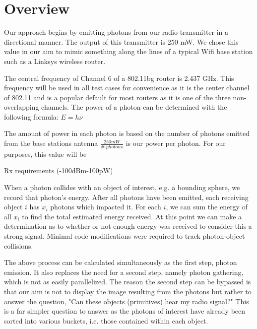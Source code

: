 \documentclass[%
        final,
        notitlepage,
        narroweqnarray,
        inline,
        twoside,
        ]{ieee}
\begin{document}




\section{Overview}
Our approach begins by emitting photons from our radio transmitter in a
directional manner.  The output of this transmitter is 250 mW.  We chose this
value in our aim to mimic something along the lines of a typical Wifi base
station such as a Linksys wireless router. 

The central frequency of Channel 6 of a 802.11b\/g router is 2.437 GHz. This frequency
will be used in all test cases for convenience as it is the center channel of 802.11 and
is a popular default for most routers as it is one of the three non-overlapping channels. 
The power of a photon can be determined with the following formula: $E = h\nu$



The amount of power in each photon is based on the number of photons emitted from the base stations
antenna
$\frac{250mW}{\#\;photons}$ is our power per photon.  For our purposes, this
value will be

Rx requirements (-100dBm-100pW)

When a photon collides with an object of interest, e.g. a bounding sphere, we
record that photon's energy.  After all photons have been emitted, each 
receiving object $i$ has $x_i$ photons which impacted it.  For each $i$, we
can sum the energy of all $x_i$ to find the total estimated energy received.
At this point we can make a determination as to whether or not enough energy
was received to consider this a strong signal.  Minimal code modifications
were required to track photon-object collisions.

The above process can be calculated simultaneously as the first step, photon
emission.  It also replaces the need for a second step, namely photon
gathering, which is not as easily parallelized.  The reason the second step can
be bypassed is that our aim is not to display the image resulting from the
photons but rather to answer the question, "Can these objects (primitives) hear
my radio signal?"  This is a far simpler question to answer as the photons of
interest have already been sorted into various buckets, i.e. those contained
within each object.
\end{document}
